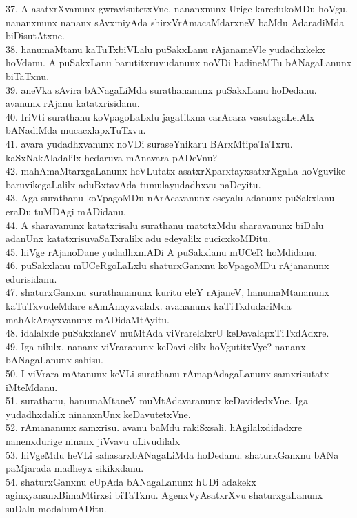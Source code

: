 \documentclass{article}
\begin{document}
37. A asatxrXvanunx gwravisutetxVne. nananxnunx Urige karedukoMDu hoVgu. nananxnunx nananx sAvxmiyAda shirxVrAmacaMdarxneV baMdu AdaradiMda biDisutAtxne.\\
38. hanumaMtanu kaTuTxbiVLalu puSakxLanu rAjanameVle yudadhxkekx hoVdanu. A puSakxLanu barutitxruvudanunx noVDi hadineMTu bANagaLanunx biTaTxnu.\\
39. aneVka sAvira bANagaLiMda surathananunx puSakxLanu hoDedanu. avanunx rAjanu katatxrisidanu.\\
40. IriVti surathanu koVpagoLaLxlu jagatitxna carAcara vasutxgaLelAlx bANadiMda mucacxlapxTuTxvu.\\
41. avara yudadhxvanunx noVDi suraseYnikaru BArxMtipaTaTxru. kaSxNakAladalilx hedaruva mAnavara pADeVnu?\\
42. mahAmaMtarxgaLanunx heVLutatx asatxrXparxtayxsatxrXgaLa hoVguvike baruvikegaLalilx aduBxtavAda tumulayudadhxvu naDeyitu.\\
43. Aga surathanu koVpagoMDu nArAcavanunx eseyalu adanunx puSakxlanu eraDu tuMDAgi mADidanu.\\
44. A sharavanunx katatxrisalu surathanu matotxMdu sharavanunx biDalu adanUnx katatxrisuvaSaTxralilx adu edeyalilx cucicxkoMDitu.\\
45. hiVge rAjanoDane yudadhxmADi A puSakxlanu mUCeR hoMdidanu.\\
46. puSakxlanu mUCeRgoLaLxlu shaturxGanxnu koVpagoMDu rAjananunx edurisidanu.\\
47. shaturxGanxnu surathananunx kuritu eleY rAjaneV, hanumaMtananunx kaTuTxvudeMdare sAmAnayxvalalx. avananunx kaTiTxdudariMda mahAkArayxvanunx mADidaMtAyitu.\\
48. idalalxde puSakxlaneV muMtAda viVrarelalxrU keDavalapxTiTxdAdxre.\\
49. Iga nilulx. nananx viVraranunx keDavi elilx hoVgutitxVye? nananx bANagaLanunx sahisu.\\
50. I viVrara mAtanunx keVLi surathanu rAmapAdagaLanunx samxrisutatx iMteMdanu.\\
51. surathanu, hanumaMtaneV muMtAdavaranunx keDavidedxVne. Iga yudadhxdalilx ninanxnUnx keDavutetxVne.\\
52. rAmananunx samxrisu. avanu baMdu rakiSxsali. hAgilalxdidadxre nanenxdurige ninanx jiVvavu uLivudilalx\\
53. hiVgeMdu heVLi sahasarxbANagaLiMda hoDedanu. shaturxGanxnu bANa paMjarada madheyx sikikxdanu.\\
54. shaturxGanxnu cUpAda bANagaLanunx hUDi adakekx aginxyananxBimaMtirxsi biTaTxnu. AgenxVyAsatxrXvu shaturxgaLanunx suDalu modalumADitu.\\
\end{document}
